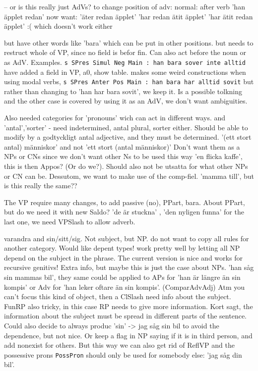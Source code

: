 \documentclass{report}
\begin{document}
-- or is this really just AdVs? 
to change position of adv:
normal: after verb 'han äpplet redan'
now want: 'äter redan äpplet'
          'har redan ätit äpplet' 
          'har ätit redan äpplet' :( which doesn't work either

but have other words like 'bara' which can be put in other positions.
  but needs to restruct whole of VP, since no field is befor fin.
  Can also act before the noun or as AdV. Examples.
\verb|s SPres Simul Neg Main : han bara sover inte alltid|
  have added a field in VP, a0, show table.
  makes some weird constructions when using modal verbs, 
  \verb|s SPres Anter Pos Main : han bara har alltid sovit|
  but rather than changing to 'han har bara sovit', we keep it. Is a possible
  tolkning and the other case is covered by using it as an AdV, we don't want
  ambiguities.

Also needed categories for 'pronouns' wich can act in different ways.
and 'antal','sorter' - need indetermined, antal plural, sorter either.
Should be able to modify by a godtyckligt antal adjective, and they must be determined.
'(ett stort antal) människor' and not 'ett stort (antal människor)'
Don't want them as a NPs or CNs since we don't want other Ns to be used this way
'en flicka kaffe', this is then Appos? (Or do we?). Should also not be utsatta for what other
NPs or CN can be. Dessutom, we want to make use of the comp-fiel. 'mamma till', but is this really
the same??

The VP require many changes, to add passive (no), PPart, bara.
About PPart, but do we need it with new Saldo? 'de är stuckna' , 'den nyligen funna'
for the last one, we need VPSlash to allow adverb.

varandra and sin/sitt/sig. Not subject, but NP.
do not want to copy all rules for another category. Would like depent types!
work pretty well by letting all NP depend on the subject in the phrase.
The current version is nice and works for recursive genitivs!
Extra info, but maybe this is just the case about NPs.
'han såg sin mammas bil', they same could be applied to
APs for 'han är längre än sin kompis' or Adv for 'han leker oftare än sin
kompis'. (ComparAdvAdj)
Atm you can't focus this kind of object, then a ClSlash need info about the
subject. FunRP also tricky, in this case RP needs to give more information.
Kort sagt, the information about the subject must be spread
in different parts of the sentence. 
Could also decide to always produc 'sin' -> jag såg sin bil
to avoid the dependence, but not nice. Or keep a flag in NP saying if it is
in third person, and add nonexist for others. But this way we can also get rid
of ReflVP and the possessive prons \verb|PossPron| should only be used for somebody else:
'jag såg din bil'.
\end{document}
